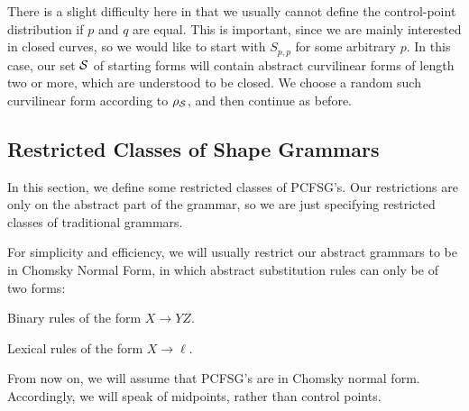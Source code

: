There is a slight difficulty here in that we usually cannot define the
control-point distribution if $p$ and $q$ are equal. This is
important, since we are mainly interested in closed curves, so we
would like to start with $S_{p,p}$ for some arbitrary $p$. In this
case, our set ${\mathcal S}$ of starting forms will contain abstract
curvilinear forms of length two or more, which are understood to be
closed. We choose a random such curvilinear form according to
$\rho_{\mathcal S}$, and then continue as before.

\subsection{Restricted Classes of Shape Grammars}

In this section, we define some restricted classes of PCFSG's. Our
restrictions are only on the abstract part of the grammar, so we are
just specifying restricted classes of traditional grammars.

For simplicity and efficiency, we will usually restrict our abstract
grammars to be in Chomsky Normal Form, in which abstract substitution
rules can only be of two forms: 
\bitem
\item Binary rules of the form $X \to Y Z$.
\item Lexical rules of the form $X \to \ell$.
\eitem 

From now on, we will assume that PCFSG's are in Chomsky normal form.
Accordingly, we will speak of midpoints, rather than control points.

